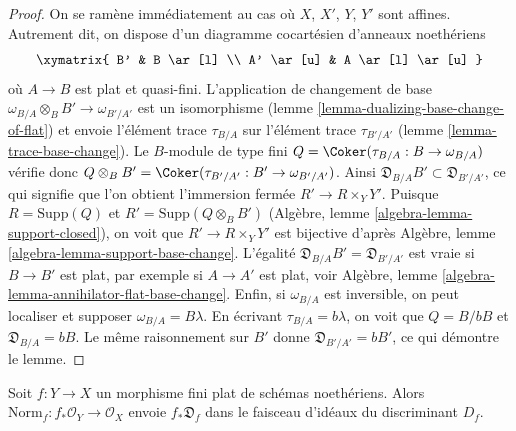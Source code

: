 \begin{proof}
On se ramène immédiatement au cas où $X$, $X'$, $Y$, $Y'$
sont affines. Autrement dit, on dispose d'un diagramme cocartésien d'anneaux
noethériens
$$
\xymatrix{
B' & B \ar[l] \\
A' \ar[u] & A \ar[l] \ar[u]
}
$$
où $A \to B$ est plat et quasi-fini. L'application de changement de base
$\omega_{B/A} \otimes_B B' \to \omega_{B'/A'}$ est un isomorphisme
(lemme \ref{lemma-dualizing-base-change-of-flat}) et envoie
l'élément trace $\tau_{B/A}$ sur l'élément trace $\tau_{B'/A'}$
(lemme \ref{lemma-trace-base-change}).
Le $B$-module de type fini $Q = \Coker(\tau_{B/A} : B \to \omega_{B/A})$
vérifie donc $Q \otimes_B B' = \Coker(\tau_{B'/A'} : B' \to \omega_{B'/A'})$.
Ainsi $\mathfrak{D}_{B/A}B' \subset \mathfrak{D}_{B'/A'}$, ce qui signifie
que l'on obtient l'immersion fermée $R' \to R \times_Y Y'$.
Puisque $R = \text{Supp}(Q)$ et $R' = \text{Supp}(Q \otimes_B B')$
(Algèbre, lemme \ref{algebra-lemma-support-closed}),
on voit que $R' \to R \times_Y Y'$ est bijective d'après
Algèbre, lemme \ref{algebra-lemma-support-base-change}.
L'égalité $\mathfrak{D}_{B/A}B' = \mathfrak{D}_{B'/A'}$ est vraie
si $B \to B'$ est plat, par exemple si $A \to A'$ est plat, voir
Algèbre, lemme \ref{algebra-lemma-annihilator-flat-base-change}.
Enfin, si $\omega_{B/A}$ est inversible, on peut localiser
et supposer $\omega_{B/A} = B \lambda$. En écrivant $\tau_{B/A} = b\lambda$,
on voit que $Q = B/bB$ et $\mathfrak{D}_{B/A} = bB$.
Le même raisonnement sur $B'$
donne $\mathfrak{D}_{B'/A'} = bB'$, ce qui démontre le lemme.
\end{proof}

\begin{lemma}
\label{lemma-norm-different-in-discriminant}
Soit $f : Y \to X$ un morphisme fini plat de schémas noethériens.
Alors $\text{Norm}_f : f_*\mathcal{O}_Y \to \mathcal{O}_X$ envoie
$f_*\mathfrak{D}_f$ dans le faisceau d'idéaux du discriminant $D_f$.
\end{lemma}

